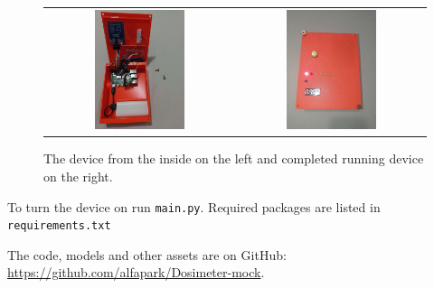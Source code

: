 \documentclass{article}
\begin{document}
\begin{figure}[ht]
    \label{wiring}
    \centering
    \begin{tabular}{cc}
        \includegraphics[width=0.5\textwidth]{imgs/Inside.jpg}
        &
        \includegraphics[width=0.5\textwidth]{imgs/Box1.jpg}
    \end{tabular}
    \caption{The device from the inside on the left and completed running device on the right.}
\end{figure}

    To turn the device on run \texttt{main.py}.
    Required packages are listed in \texttt{requirements.txt}


    The code, models and other assets are on GitHub: \url{https://github.com/alfapark/Dosimeter-mock}.
\end{document}
